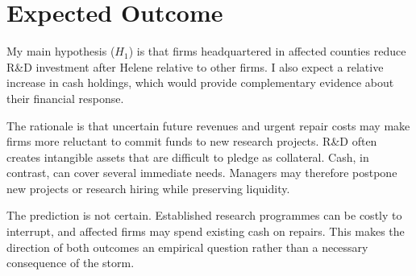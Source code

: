 \section*{Expected Outcome}

My main hypothesis ($H_1$) is that firms headquartered in affected counties reduce R\&D investment after Helene relative to other firms. I also expect a relative increase in cash holdings, which would provide complementary evidence about their financial response.

The rationale is that uncertain future revenues and urgent repair costs may make firms more reluctant to commit funds to new research projects. R\&D often creates intangible assets that are difficult to pledge as collateral. Cash, in contrast, can cover several immediate needs. Managers may therefore postpone new projects or research hiring while preserving liquidity.

The prediction is not certain. Established research programmes can be costly to interrupt, and affected firms may spend existing cash on repairs. This makes the direction of both outcomes an empirical question rather than a necessary consequence of the storm.
